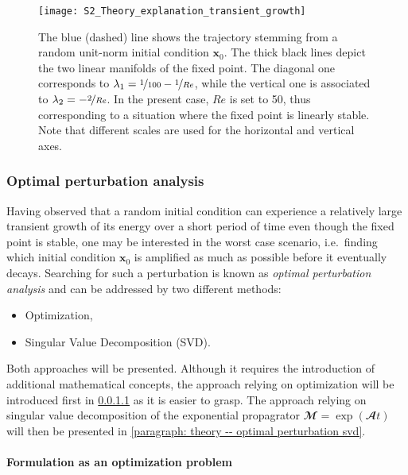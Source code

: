   \begin{figure}[b]
    \centering
    \texttt{[image: S2\_Theory\_explanation\_transient\_growth]}
    \caption{The blue (dashed) line shows the trajectory stemming from a random unit-norm initial condition $\mathbf{x}_0$. The thick black lines depict the two linear manifolds of the fixed point. The diagonal one corresponds to $\lambda_1 = \nicefrac{1}{100} - \nicefrac{1}{Re}$, while the vertical one is associated to $\lambda_2 = -\nicefrac{2}{Re}$. In the present case, $Re$ is set to 50, thus corresponding to a situation where the fixed point is linearly stable. Note that different scales are used for the horizontal and vertical axes.}
    \label{fig: theory -- illustration transient growth}
  \end{figure}

    \subsubsection{Optimal perturbation analysis}
    \label{subsubsec: theory -- optimal perturbation}

    Having observed that a random initial condition can experience a relatively large transient growth of its energy over a short period of time even though the fixed point is stable, one may be interested in the worst case scenario, i.e.\ finding which initial condition $\mathbf{x}_0$ is amplified as much as possible before it eventually decays. Searching for such a perturbation is known as \emph{optimal perturbation analysis} and can be addressed by two different methods:
    \begin{itemize}
      \item Optimization,
      \item Singular Value Decomposition (SVD).
    \end{itemize}
    Both approaches will be presented. Although it requires the introduction of additional mathematical concepts, the approach relying on optimization will be introduced first in \textsection \ref{paragraph: theory -- optimal perturbation optimization} as it is easier to grasp. The approach relying on singular value decomposition of the exponential propagrator $\mathbfcal{M} = \exp \left( \mathbfcal{A} t \right)$ will then be presented in \textsection \ref{paragraph: theory -- optimal perturbation svd}.

      \paragraph{Formulation as an optimization problem}
      \label{paragraph: theory -- optimal perturbation optimization}

